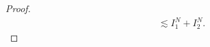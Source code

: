 \documentclass[a4paper,12pt, reqno]{amsart}
\newcommand{\E}{\ensuremath{\mathbb{E}}}
\begin{document}
\begin{proof}
\begin{align*}
    &\lesssim I^N_1 + I^N_2.
\end{align*}

\end{proof}
\end{document}
